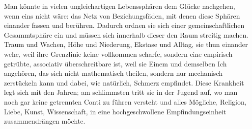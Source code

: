 Man könnte in vielen ungleichartigen Lebenssphären dem Glücke nachgehen, wenn eins nicht wäre: das Netz von Beziehungsfäden, mit denen diese Sphären einander fassen und berühren. Dadurch ordnen sie sich einer gemeinschaftlichen Gesammtsphäre ein und müssen sich innerhalb dieser den Raum streitig machen. Traum und Wachen, Höhe und Niederung, Ekstase und Alltag, sie thun einander wehe, weil ihre Grenzlinie keine vollkommen scharfe, sondern eine empirisch getrübte, associativ überschreitbare ist, weil sie Einem und demselben Ich angehören, das sich nicht mathematisch theilen, sondern nur mechanisch zerstückeln kann und dabei, wie natürlich, Schmerz empfindet. Diese Krankheit legt sich mit den Jahren; am schlimmsten tritt sie in der Jugend auf, wo man noch gar keine getrennten Conti zu führen versteht und alles Mögliche, Religion, Liebe, Kunst, Wissenschaft, in eine hochgeschwollene Empfindungseinheit zusammendrängen möchte.
\par

